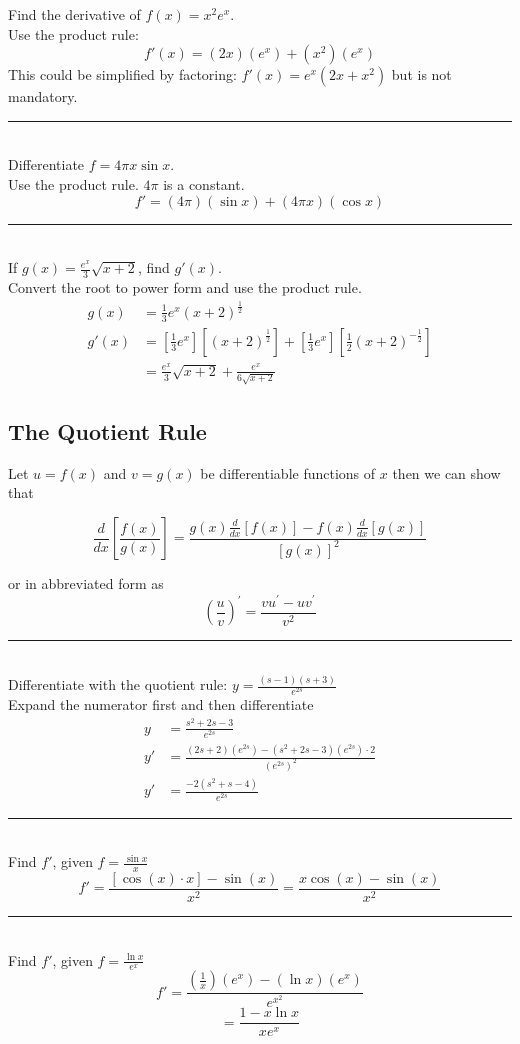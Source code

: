 \example Find the derivative of $f(x)=x^2e^x$.\medskip\\
\solution Use the product rule:
$$f'(x)=(2x)(e^x)+(x^2)(e^x)$$
This could be simplified by factoring: $f'(x)=e^x(2x+x^2)$ but is not mandatory.\\\medskip
\rule{6.8cm}{0.5pt}\\
\example Differentiate $f=4\pi x\sin x$.\medskip\\
\solution Use the product rule. $4\pi$ is a constant.
$$f'=(4\pi)(\sin x)+(4\pi x)(\cos x)$$
\rule{6.8cm}{0.5pt}\\
\example If $g(x)=\frac{e^x}{3}\sqrt{x+2}$, find $g'(x)$.\medskip\\
\solution Convert the root to power form and use the product rule.
\begin{align*}
g(x)&=\frac{1}{3}e^x(x+2)^{\frac{1}{2}}\\
g'(x)&=\left[\frac{1}{3}e^x\right]\left[(x+2)^{\frac{1}{2}}\right]+\left[\frac{1}{3}e^x\right]\left[\frac{1}{2}(x+2)^{-\frac{1}{2}}\right]\\
&=\frac{e^x}{3}\sqrt{x+2}+\frac{e^x}{6\sqrt{x+2}}
\end{align*}

\subsection*{The Quotient Rule}
Let $u =f (x)$ and $v =g (x)$ be differentiable functions of $x$ then we can show that
\begin{tcolorbox}
	\[\frac{d}{d x} \genfrac{[}{]}{}{}{f (x)}{g (x)} =\frac{g (x) \frac{d}{d x} \left [f (x)\right ] -f (x) \frac{d}{d x} \left [g (x)\right ]}{\left [g (x)\right ]^{2}}
\]
\end{tcolorbox}
or in abbreviated form as
\begin{equation*}\genfrac{(}{)}{}{}{u}{v}^{ \prime } =\frac{v u^{ \prime } -u v^{ \prime }}{v^{2}}
\end{equation*}
\rule{6.8cm}{0.5pt}\\
\example Differentiate with the quotient rule: $y=\frac{(s-1)(s+3)}{e^{2s}}$\medskip\\
\solution Expand the numerator first and then differentiate\\
\begin{align*}y&=\frac{s^2+2s-3}{e^{2s}}\\
y'&=\frac{(2s+2)(e^{2s})-(s^2+2s-3)(e^{2s})\cdot2}{(e^{2s})^2}\\
y'&=\frac{-2(s^2+s-4)}{e^{2s}}
\end{align*}
\rule{6.8cm}{0.5pt}\\
\example Find $f'$, given $f=\frac{\sin x}{x}$\medskip\\
\solution $$f'=\frac{[\cos(x)\cdot x]-\sin(x)}{x^2}=\frac{x\cos(x)-\sin(x)}{x^2}$$
\rule{6.8cm}{0.5pt}\\
\example Find $f'$, given $\displaystyle f=\frac{\ln x}{e^x}$\medskip\\
\solution $$f'=\frac{(\frac{1}{x})(e^x)-(\ln x)(e^x)}{e^{x^2}}$$
$$=\frac{1-x\ln x}{xe^x}$$

